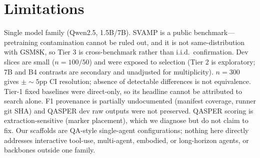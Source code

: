 \documentclass[11pt]{article}
\begin{document}
\section{Limitations}

Single model family (Qwen2.5, 1.5B/7B). SVAMP is a public
benchmark---pretraining contamination cannot be ruled out, and it is not
same-distribution with GSM8K, so Tier 3 is cross-benchmark rather than
i.i.d.\ confirmation. Dev slices are small ($n{=}100/50$) and were exposed
to selection (Tier 2 is exploratory; 7B and B4 contrasts are secondary and
unadjusted for multiplicity). $n{=}300$ gives $\pm{\sim}5$pp CI resolution;
absence of detectable differences is not equivalence. Tier-1 fixed
baselines were direct-only, so its headline cannot be attributed to search
alone. F1 provenance is partially undocumented (manifest coverage, runner
git SHA) and QASPER dev raw outputs were not preserved. QASPER scoring is
extraction-sensitive (marker placement), which we diagnose but do not claim
to fix. Our scaffolds are QA-style single-agent configurations; nothing
here directly addresses interactive tool-use, multi-agent, embodied, or
long-horizon agents, or backbones outside one family.


\end{document}

